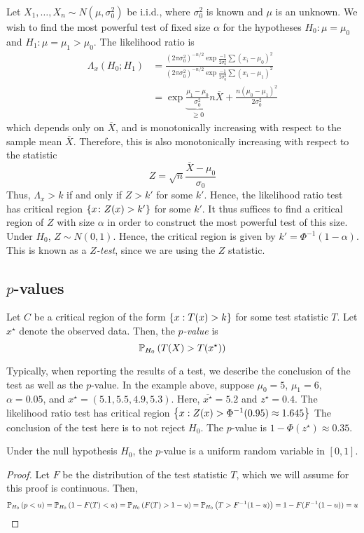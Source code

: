 \begin{example}
	Let \( X_1, \dots, X_n \sim N(\mu, \sigma_0^2) \) be i.i.d., where \( \sigma_0^2 \) is known and \( \mu \) is an unknown.
	We wish to find the most powerful test of fixed size \( \alpha \) for the hypotheses \( H_0 \colon \mu = \mu_0 \) and \( H_1 \colon \mu = \mu_1 > \mu_0 \).
	The likelihood ratio is
	\begin{align*}
		\Lambda_x(H_0;H_1) &= \frac{(2\pi \sigma_0^2)^{-n/2} \exp{\frac{-1}{2\sigma_0^2} \sum (x_i - \mu_0)^2}}{(2\pi \sigma_0^2)^{-n/2} \exp{\frac{-1}{2\sigma_0^2} \sum (x_i - \mu_1)^2}} \\
		&= \exp{\underbrace{\frac{\mu_1 - \mu_0}{\sigma_0^2}}_{\geq 0} n \overline X + \frac{n(\mu_0 - \mu_1)^2}{2\sigma_0^2}}
	\end{align*}
	which depends only on \( \overline X \), and is monotonically increasing with respect to the sample mean \( \overline X \).
	Therefore, this is also monotonically increasing with respect to the statistic
	\[ Z = \sqrt{n}\frac{\overline X - \mu_0}{\sigma_0} \]
	Thus, \( \Lambda_x > k \) if and only if \( Z > k' \) for some \( k' \).
	Hence, the likelihood ratio test has critical region \( \qty{x\colon Z(x) > k'} \) for some \( k' \).
	It thus suffices to find a critical region of \( Z \) with size \( \alpha \) in order to construct the most powerful test of this size.
	Under \( H_0 \), \( Z \sim N(0,1) \).
	Hence, the critical region is given by \( k' = \Phi^{-1}(1-\alpha) \).
	This is known as a \textit{\( Z \)-test}, since we are using the \( Z \) statistic.
\end{example}

\subsection{\( p \)-values}
\begin{definition}
	Let \( C \) be a critical region of the form \( \qty{ x: T(x) > k } \) for some test statistic \( T \).
	Let \( x^\star \) denote the observed data.
	Then, the \textit{\( p \)-value} is
	\[ \mathbb{P}_{H_0}\left({T(X) > T(x^\star)}\right) \]
\end{definition}
Typically, when reporting the results of a test, we describe the conclusion of the test as well as the \( p \)-value.
In the example above, suppose \( \mu_0 = 5 \), \( \mu_1 = 6 \), \( \alpha = 0.05 \), and \( x^\star = (5.1, 5.5, 4.9, 5.3) \).
Here, \( \overline{x^\star} = 5.2 \) and \( z^\star = 0.4 \).
The likelihood ratio test has critical region \( \qty{x: Z(x) > \Phi^{-1}(0.95) \approx 1.645} \)
The conclusion of the test here is to not reject \( H_0 \).
The \( p \)-value is \( 1 - \Phi(z^\star) \approx 0.35 \).
\begin{proposition}
	Under the null hypothesis \( H_0 \), the \( p \)-value is a uniform random variable in \( [0,1] \).
\end{proposition}
\begin{proof}
	Let \( F \) be the distribution of the test statistic \( T \), which we will assume for this proof is continuous.
	Then,
	\[ \mathbb{P}_{H_0}\left({p < u}\right) = \mathbb{P}_{H_0}\left({1 - F(T) < u}\right) = \mathbb{P}_{H_0}\left({F(T) > 1-u}\right) = \mathbb{P}_{H_0}\left({T > F^{-1}(1-u)}\right) = 1 - F(F^{-1}(1-u)) = u \]
\end{proof}

